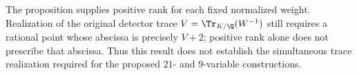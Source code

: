 The proposition supplies positive rank for each fixed normalized
weight. Realization of the original detector trace
$V=\Tr_{K/\Q}(W^{-1})$ still requires a rational point whose
abscissa is precisely $V+2$; positive rank alone does not prescribe
that abscissa. Thus this result does not establish the simultaneous
trace realization required for the proposed $21$- and $9$-variable
constructions.
